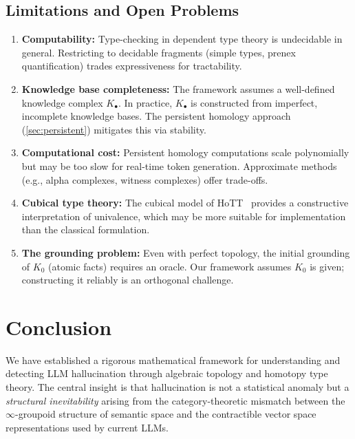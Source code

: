 \documentclass[11pt,a4paper]{article}
\theoremstyle{plain}
\theoremstyle{definition}
\theoremstyle{remark}
\begin{document}
\subsection{Limitations and Open Problems}

\begin{enumerate}[nosep]
  \item \textbf{Computability:} Type-checking in dependent type theory is undecidable in general. Restricting to decidable fragments (simple types, prenex quantification) trades expressiveness for tractability.

  \item \textbf{Knowledge base completeness:} The framework assumes a well-defined knowledge complex $K_\bullet$. In practice, $K_\bullet$ is constructed from imperfect, incomplete knowledge bases. The persistent homology approach (\cref{sec:persistent}) mitigates this via stability.

  \item \textbf{Computational cost:} Persistent homology computations scale polynomially but may be too slow for real-time token generation. Approximate methods (e.g., alpha complexes, witness complexes) offer trade-offs.

  \item \textbf{Cubical type theory:} The cubical model of HoTT~\cite{cchm2018} provides a constructive interpretation of univalence, which may be more suitable for implementation than the classical formulation.

  \item \textbf{The grounding problem:} Even with perfect topology, the initial grounding of $K_0$ (atomic facts) requires an oracle. Our framework assumes $K_0$ is given; constructing it reliably is an orthogonal challenge.
\end{enumerate}


\section{Conclusion}
\label{sec:conclusion}

We have established a rigorous mathematical framework for understanding and detecting LLM hallucination through algebraic topology and homotopy type theory. The central insight is that hallucination is not a statistical anomaly but a \emph{structural inevitability} arising from the category-theoretic mismatch between the $\infty$-groupoid structure of semantic space and the contractible vector space representations used by current LLMs.
\end{document}

